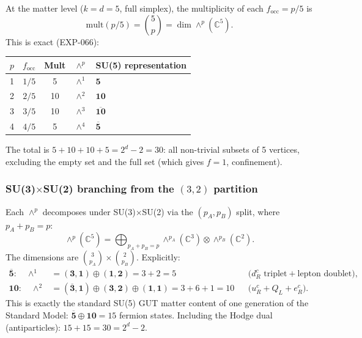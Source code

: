 \documentclass[12pt]{article}
\theoremstyle{remark}
\theoremstyle{definition}
\newcommand{\CC}{\mathbb{C}}
\begin{document}
At the matter level ($k = d = 5$, full simplex), the multiplicity of each $f_\mathrm{occ} = p/5$ is
\begin{equation}
\mathrm{mult}(p/5) = \binom{5}{p} = \dim \wedge^p(\CC^5).
\end{equation}
This is exact (EXP-066):
\begin{center}
\begin{tabular}{ccccl}
\hline
$p$ & $f_\mathrm{occ}$ & Mult & $\wedge^p$ & SU(5) representation \\
\hline
1 & $1/5$ & 5 & $\wedge^1$ & $\mathbf{5}$ \\
2 & $2/5$ & 10 & $\wedge^2$ & $\mathbf{10}$ \\
3 & $3/5$ & 10 & $\wedge^3$ & $\overline{\mathbf{10}}$ \\
4 & $4/5$ & 5 & $\wedge^4$ & $\overline{\mathbf{5}}$ \\
\hline
\end{tabular}
\end{center}
The total is $5 + 10 + 10 + 5 = 2^d - 2 = 30$: all non-trivial subsets of 5 vertices, excluding the empty set and the full set (which gives $f = 1$, confinement).

\subsubsection{SU(3)$\times$SU(2) branching from the $(3,2)$ partition}

Each $\wedge^p$ decomposes under SU(3)$\times$SU(2) via the $(p_A, p_B)$ split, where $p_A + p_B = p$:
\begin{equation}
\wedge^p(\CC^5) = \bigoplus_{p_A + p_B = p} \wedge^{p_A}(\CC^3) \otimes \wedge^{p_B}(\CC^2).
\end{equation}
The dimensions are $\binom{3}{p_A} \times \binom{2}{p_B}$.  Explicitly:
\begin{align}
\overline{\mathbf{5}}: \quad \wedge^1 &= (\mathbf{3},\mathbf{1}) \oplus (\mathbf{1},\mathbf{2}) = 3 + 2 = 5
&&\text{(}d_R^c \text{ triplet} + \text{lepton doublet),} \\
\mathbf{10}: \quad \wedge^2 &= (\overline{\mathbf{3}},\mathbf{1}) \oplus (\mathbf{3},\mathbf{2}) \oplus (\mathbf{1},\mathbf{1}) = 3 + 6 + 1 = 10
&&\text{(}u_R^c + Q_L + e_R^c\text{).}
\end{align}
This is exactly the standard SU(5) GUT matter content of one generation of the Standard Model: $\overline{\mathbf{5}} \oplus \mathbf{10} = 15$ fermion states.  Including the Hodge dual (antiparticles): $15 + 15 = 30 = 2^d - 2$.
\end{document}
